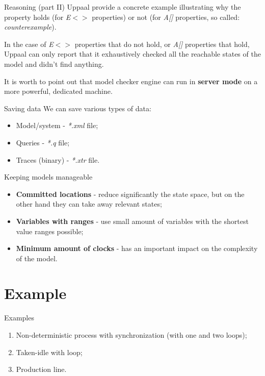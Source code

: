 \documentclass{beamer}
\begin{document}
\begin{frame}{Reasoning (part II)}
	Uppaal provide a concrete example illustrating why the property holds (for \textit{E$<>$} properties) or not (for \textit{A[]} properties, so called: \textit{counterexample}).\newline
		
	In the case of \textit{E$<>$} properties that do not hold, or \textit{A[]} properties that hold, Uppaal can only report that it exhaustively checked all the reachable states of the model and didn't find anything.\newline
	
	It is worth to point out that model checker engine can run in \textbf{server mode} on a more powerful, dedicated machine.
\end{frame}


\begin{frame}{Saving data}
	We can save various types of data:
	
	\begin{itemize}
		\item Model/system - \textit{*.xml} file;
		\item Queries - \textit{*.q} file;
		\item Traces (binary) - \textit{*.xtr} file.
	\end{itemize}
\end{frame}

\begin{frame}{Keeping models manageable}
	\begin{itemize}
		\item \textbf{Committed locations} - reduce significantly the state space, but on the other hand they can take away relevant states;
		\item \textbf{Variables with ranges} - use small amount of variables with the shortest value ranges possible;
		\item \textbf{Minimum amount of clocks} - has an important impact on the complexity of the model.
	\end{itemize}
\end{frame}

\section{Example}

\begin{frame}{Examples}
	\begin{enumerate}
		\item Non-deterministic process with synchronization (with one and two loops);
		\item Taken-idle with loop;
		\item Production line.
	\end{enumerate}
\end{frame}
\end{document}
